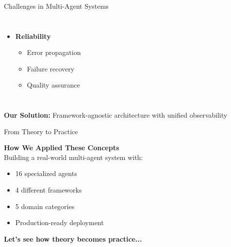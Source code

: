 \documentclass[aspectratio=169,11pt]{beamer}
\begin{document}
\begin{frame}{Challenges in Multi-Agent Systems}
\begin{columns}
\begin{itemize}
    \item {} \textbf{Reliability}
    \begin{itemize}
        \item Error propagation
        \item Failure recovery
        \item Quality assurance
    \end{itemize}
\end{itemize}
\end{columns}

\vspace{0.3cm}
\begin{center}
\textbf{Our Solution:} Framework-agnostic architecture with unified observability
\end{center}
\end{frame}


\begin{frame}{From Theory to Practice}
\begin{center}
\Large
\textbf{How We Applied These Concepts}\\
\vspace{0.5cm}
\normalsize
Building a real-world multi-agent system with:\\
\vspace{0.3cm}
\begin{itemize}
    \item 16 specialized agents
    \item 4 different frameworks
    \item 5 domain categories
    \item Production-ready deployment
\end{itemize}

\vspace{0.5cm}
\textbf{Let's see how theory becomes practice...}
\end{center}
\end{frame}

\end{document}
